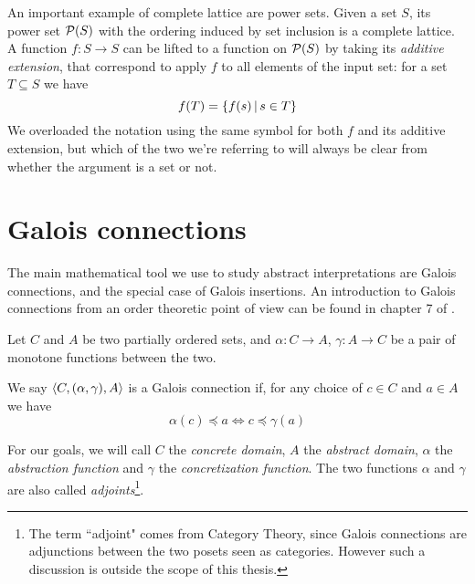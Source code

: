An important example of complete lattice are power sets. Given a set $S$, its power set $\mathcal{P}(S)$ with the ordering induced by set inclusion is a complete lattice. A function $f : S \rightarrow S$ can be lifted to a function on $\mathcal{P}(S)$ by taking its \textit{additive extension}, that correspond to apply $f$ to all elements of the input set: for a set $T \subseteq S$ we have
\[
f(T) = \{ f(s) \,\vert\, s \in T \}
\]
We overloaded the notation using the same symbol for both $f$ and its additive extension, but which of the two we're referring to will always be clear from whether the argument is a set or not.

\section{Galois connections}
The main mathematical tool we use to study abstract interpretations are Galois connections, and the special case of Galois insertions. An introduction to Galois connections from an order theoretic point of view can be found in chapter 7 of \cite{order-theory-book}.

\begin{definition}\label{ch2:def:gc}
	Let $C$ and $A$ be two partially ordered sets, and $\alpha : C \rightarrow A$, $\gamma : A \rightarrow C$ be a pair of monotone functions between the two.

	We say $\langle C, (\alpha, \gamma), A \rangle$ is a Galois connection if, for any choice of $c \in C$ and $a \in A$ we have
	\[
	\alpha(c) \preceq a \iff c \preceq \gamma(a)
	\]
\end{definition}
For our goals, we will call $C$ the \textit{concrete domain}, $A$ the \textit{abstract domain}, $\alpha$ the \textit{abstraction function} and $\gamma$ the \textit{concretization function}. The two functions $\alpha$ and $\gamma$ are also called \textit{adjoints}\footnote{The term ``adjoint" comes from Category Theory, since Galois connections are adjunctions between the two posets seen as categories. However such a discussion is outside the scope of this thesis.}.

